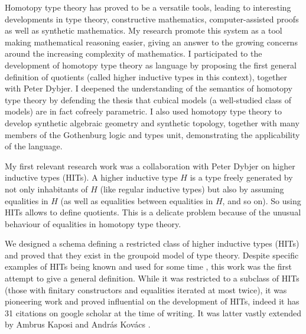 \documentclass{article}
\begin{document}
Homotopy type theory has proved to be a versatile tools, leading to interesting developments in type theory, constructive mathematics, computer-assisted proofs as well as synthetic mathematics. My research promote this system as a tool making mathematical reasoning easier, giving an answer to the growing concerns around the increasing complexity of mathematics. I participated to the development of homotopy type theory as language by proposing the first general definition of quotients (called higher inductive types in this context), together with Peter Dybjer. I deepened the understanding of the semantics of homotopy type theory by defending the thesis that cubical models (a well-studied class of models) are in fact cofreely parametric. I also used homotopy type theory to develop synthetic algebraic geometry and synthetic topology, together with many members of the Gothenburg logic and types unit, demonstrating the applicability of the language.

My first relevant research work was a collaboration with Peter Dybjer on higher inductive types (HITs). A higher inductive type $H$ is a type freely generated by not only inhabitants of $H$ (like regular inductive types) but also by assuming equalities in $H$ (as well as equalities between equalities in $H$, and so on). So using HITs allows to define quotients. This is a delicate problem because of the unusual behaviour of equalities in homotopy type theory.

We designed a schema defining a restricted class of higher inductive types (HITs) and proved that they exist in the groupoid model of type theory. Despite specific examples of HITs being known and used for some time \cite{hottbook}, this work was the first attempt to give a general definition. While it was restricted to a subclass of HITs (those with finitary constructors and equalities iterated at most twice), it was pioneering work and proved influential on the development of HITs, indeed it has 31 citations on google scholar at the time of writing. It was latter vastly extended by Ambrus Kaposi and Andr\'as Kov\'acs \cite{kaposi2020signatures}.
\end{document}
